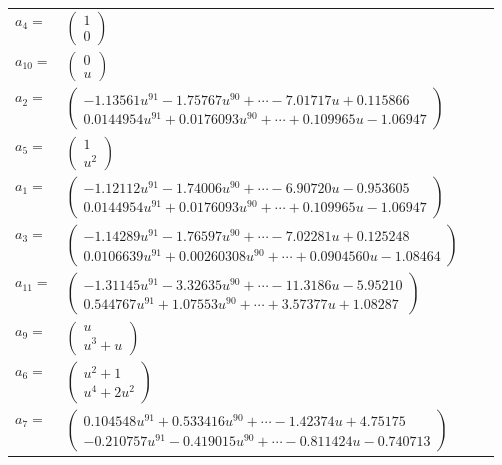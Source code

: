 \documentclass[1p]{elsarticle_modified}
\theoremstyle{definition}
\begin{document}
\begin{tabular}{m{7pt} m{180pt} m{7pt} m{180pt} }
\flushright $a_{4}=$&$\begin{pmatrix}1\\0\end{pmatrix}$ \\
\flushright $a_{10}=$&$\begin{pmatrix}0\\u\end{pmatrix}$ \\
\flushright $a_{2}=$&$\begin{pmatrix}-1.13561 u^{91}-1.75767 u^{90}+\cdots-7.01717 u+0.115866\\0.0144954 u^{91}+0.0176093 u^{90}+\cdots+0.109965 u-1.06947\end{pmatrix}$ \\
\flushright $a_{5}=$&$\begin{pmatrix}1\\u^2\end{pmatrix}$ \\
\flushright $a_{1}=$&$\begin{pmatrix}-1.12112 u^{91}-1.74006 u^{90}+\cdots-6.90720 u-0.953605\\0.0144954 u^{91}+0.0176093 u^{90}+\cdots+0.109965 u-1.06947\end{pmatrix}$ \\
\flushright $a_{3}=$&$\begin{pmatrix}-1.14289 u^{91}-1.76597 u^{90}+\cdots-7.02281 u+0.125248\\0.0106639 u^{91}+0.00260308 u^{90}+\cdots+0.0904560 u-1.08464\end{pmatrix}$ \\
\flushright $a_{11}=$&$\begin{pmatrix}-1.31145 u^{91}-3.32635 u^{90}+\cdots-11.3186 u-5.95210\\0.544767 u^{91}+1.07553 u^{90}+\cdots+3.57377 u+1.08287\end{pmatrix}$ \\
\flushright $a_{9}=$&$\begin{pmatrix}u\\u^3+u\end{pmatrix}$ \\
\flushright $a_{6}=$&$\begin{pmatrix}u^2+1\\u^4+2 u^2\end{pmatrix}$ \\
\flushright $a_{7}=$&$\begin{pmatrix}0.104548 u^{91}+0.533416 u^{90}+\cdots-1.42374 u+4.75175\\-0.210757 u^{91}-0.419015 u^{90}+\cdots-0.811424 u-0.740713\end{pmatrix}$ \\

\end{tabular}
\end{document}
